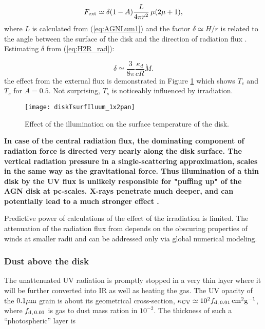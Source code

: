 \documentclass[12pt,english,preprint]{aastex}
\newcommand{\mybf}{\bf}
\begin{document}
\begin{equation}
F_{{\rm ext}}\simeq\delta(1-A)\frac{L}{4\pi r^{2}}\,\mu(2\mu+1)\mbox{,}\label{eq:FextFormula}
\end{equation}
where $L$ is calculated from (\ref{eq:AGNLum1}) and the factor $\delta\simeq H/r$
is related to the angle between the surface of the disk and the direction
of radiation flux \citep{meyerVerticalStructureAccretion1982,Spruit96}.
Estimating $\delta$ from (\ref{eq:H2R_rad}):

\begin{equation}
\delta\simeq\frac{3}{8\pi}\frac{\kappa_{d}}{cR}\dot{M}\mbox{.}\label{eq:delt_illum}
\end{equation}
the effect from the external flux is demonstrated in Figure \ref{Fig:TcWithExtIrrad}
which shows $T_{c}$ and $T_{s}$ for $A=0.5$. Not surprising, $T_{s}$
is noticeably influenced by irradiation. 
\begin{figure}
\texttt{[image: diskTsurfIluum\_1x2pan]}\caption{Effect of the illumination on the surface temperature of the disk.}
\label{Fig:TcWithExtIrrad} 
\end{figure}


{\mybf
In case of the central radiation flux, the dominating component of radiation force is directed very 
nearly along the disk surface.  The vertical radiation pressure in a single-scattering approximation, scales in the same way as the gravitational
force. Thus illumination of a thin disk by the UV flux is unlikely responsible for "puffing up" of the AGN disk at pc-scales.
X-rays penetrate much deeper, and can potentially lead to a much stronger effect \citep{Chang_etal07,Dorodnitsyn16}.
}

Predictive power of calculations of the effect of the irradiation
is limited. The attenuation of the radiation flux from depends on
the obscuring properties of winds at smaller radii and can be addressed
only via global numerical modeling.

\subsubsection{Dust above the disk}

The unattenuated UV radiation is promptly stopped in a very thin layer
where it will be further converted into IR as well as heating the
gas. The UV opacity of the $0.1{\rm \mu m}$ grain is about its geometrical
cross-section, $\kappa_{{\rm UV}}\simeq10^{2}f_{{\rm d,\,0.01}}\,{\rm cm^{2}g^{-1}}$,
where $f_{{\rm d,\,0.01}}$ is gas to dust mass ration in $10^{-2}$.
The thickness of such a ``photospheric'' layer is
\end{document}
